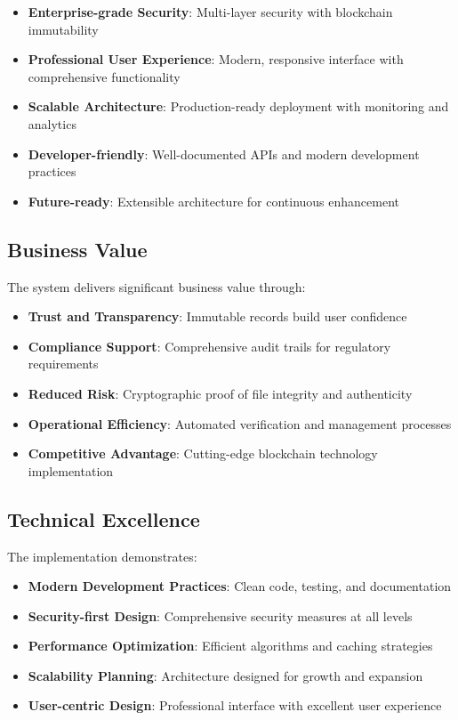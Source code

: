 \documentclass[11pt,a4paper]{article}
\begin{document}
\begin{itemize}
    \item \textbf{Enterprise-grade Security}: Multi-layer security with blockchain immutability
    \item \textbf{Professional User Experience}: Modern, responsive interface with comprehensive functionality
    \item \textbf{Scalable Architecture}: Production-ready deployment with monitoring and analytics
    \item \textbf{Developer-friendly}: Well-documented APIs and modern development practices
    \item \textbf{Future-ready}: Extensible architecture for continuous enhancement
\end{itemize}

\subsection{Business Value}

The system delivers significant business value through:

\begin{itemize}
    \item \textbf{Trust and Transparency}: Immutable records build user confidence
    \item \textbf{Compliance Support}: Comprehensive audit trails for regulatory requirements
    \item \textbf{Reduced Risk}: Cryptographic proof of file integrity and authenticity
    \item \textbf{Operational Efficiency}: Automated verification and management processes
    \item \textbf{Competitive Advantage}: Cutting-edge blockchain technology implementation
\end{itemize}

\subsection{Technical Excellence}

The implementation demonstrates:

\begin{itemize}
    \item \textbf{Modern Development Practices}: Clean code, testing, and documentation
    \item \textbf{Security-first Design}: Comprehensive security measures at all levels
    \item \textbf{Performance Optimization}: Efficient algorithms and caching strategies
    \item \textbf{Scalability Planning}: Architecture designed for growth and expansion
    \item \textbf{User-centric Design}: Professional interface with excellent user experience
\end{itemize}
\end{document}
